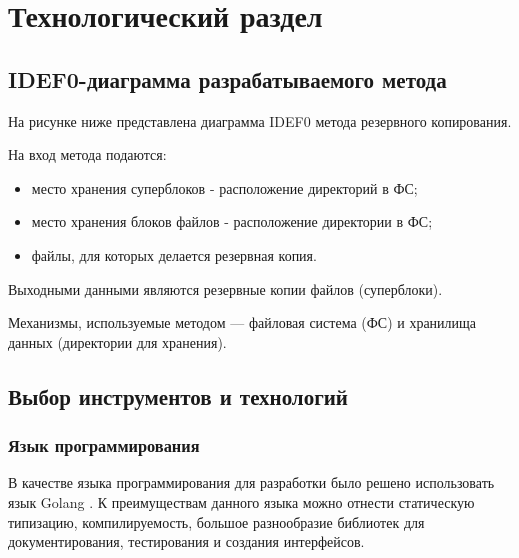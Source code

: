 \chapter{Технологический раздел}

\section{IDEF0-диаграмма разрабатываемого метода}

На рисунке ниже представлена диаграмма IDEF0 метода резервного копирования.


\begin{flushleft}
На вход метода подаются:
\end{flushleft}
\begin{itemize}[label=\textbullet]
\item место хранения суперблоков - расположение директорий в ФС;
\item место хранения блоков файлов - расположение директории в ФС;
\item файлы, для которых делается резервная копия.
\end{itemize}

Выходными данными являются резервные копии файлов (суперблоки).  

Механизмы, используемые методом --- файловая система (ФС) и хранилища данных (директории для хранения).  

\section{Выбор инструментов и технологий}

\subsection{Язык программирования}

В качестве языка программирования для разработки  было решено использовать язык Golang \cite{golang}. К преимуществам данного языка можно отнести статическую типизацию, компилируемость, большое
разнообразие библиотек для документирования, тестирования и создания интерфейсов.

